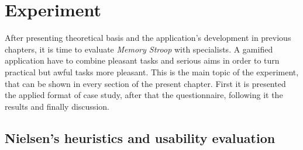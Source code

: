\chapter{Experiment}
\label{ch:experiment}

After presenting theoretical basis and the application's development in previous chapters, it is time to evaluate \textit{Memory Stroop} with specialists. A gamified application have to combine pleasant tasks and serious aims in order to turn practical but awful tasks more pleasant. This is the main topic of the experiment, that can be shown in every section of the present chapter. First it is presented the applied format of case study, after that the questionnaire, following it the results and finally discussion.

\section{Nielsen's heuristics and usability evaluation}

